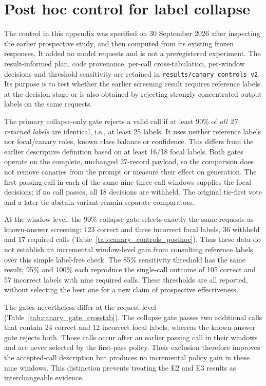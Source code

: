 \clearpage
\section{Post hoc control for label collapse}\label{app:canary_controls}
The control in this appendix was specified on 30 September 2026 after inspecting the earlier prospective study, and then computed from its existing frozen responses. It added no model requests and is not a preregistered experiment. The result-informed plan, code provenance, per-call cross-tabulation, per-window decisions and threshold sensitivity are retained in \nolinkurl{results/canary_controls_v2}. Its purpose is to test whether the earlier screening result requires reference labels at the decision stage or is also obtained by rejecting strongly concentrated output labels on the same requests.

The primary collapse-only gate rejects a valid call if at least 90\% of \emph{all 27 returned labels} are identical, i.e., at least 25 labels. It uses neither reference labels nor focal/canary roles, known class balance or confidence. This differs from the earlier descriptive definition based on at least 16/18 focal labels. Both gates operate on the complete, unchanged 27-record payload, so the comparison does not remove canaries from the prompt or measure their effect on generation. The first passing call in each of the same nine three-call windows supplies the focal decisions; if no call passes, all 18 decisions are withheld. The original tie-first vote and a later tie-abstain variant remain separate comparators.

At the window level, the 90\% collapse gate selects exactly the same requests as known-answer screening: 123 correct and three incorrect focal labels, 36 withheld and 17 required calls (Table~\ref{tab:canary_controls_posthoc}). Thus these data do not establish an incremental window-level gain from consulting reference labels over this simple label-free check. The 85\% sensitivity threshold has the same result; 95\% and 100\% each reproduce the single-call outcome of 105 correct and 57 incorrect labels with nine required calls. These thresholds are all reported, without selecting the best one for a new claim of prospective effectiveness.

The gates nevertheless differ at the request level (Table~\ref{tab:canary_gate_crosstab}). The collapse gate passes two additional calls that contain 24 correct and 12 incorrect focal labels, whereas the known-answer gate rejects both. Those calls occur after an earlier passing call in their windows and are never selected by the first-pass policy. Their exclusion therefore improves the accepted-call description but produces no incremental policy gain in these nine windows. This distinction prevents treating the E2 and E3 results as interchangeable evidence.

